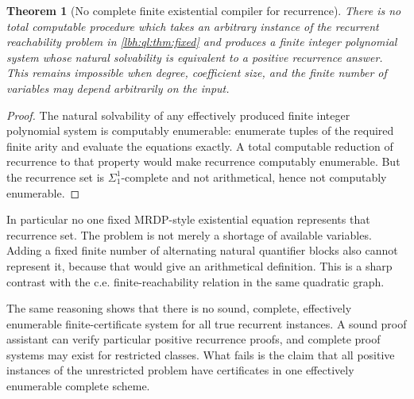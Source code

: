\documentclass[11pt,letterpaper]{article}
\newtheorem{theorem}{Theorem}[section]
\theoremstyle{definition}
\theoremstyle{remark}
\newcommand{\1}{\mathbf 1}
\begin{document}
\begin{theorem}[No complete finite existential compiler for recurrence]
\label{lbh:ql:thm:nofinite}
There is no total computable procedure which takes an arbitrary instance of
the recurrent reachability problem in \cref{lbh:ql:thm:fixed} and produces a finite
integer polynomial system whose natural solvability is equivalent to a
positive recurrence answer. This remains impossible when degree, coefficient
size, and the finite number of variables may depend arbitrarily on the input.
\end{theorem}
\begin{proof}
The natural solvability of any effectively produced finite integer polynomial
system is computably enumerable: enumerate tuples of the required finite
arity and evaluate the equations exactly. A total computable reduction of
recurrence to that property would make recurrence computably enumerable.
But the recurrence set is $\Sigma^1_1$-complete and not arithmetical, hence
not computably enumerable.
\end{proof}
In particular no one fixed MRDP-style existential equation represents that
recurrence set. The problem is not merely a shortage of available variables.
Adding a fixed finite number of alternating natural quantifier blocks also
cannot represent it, because that would give an arithmetical definition.
This is a sharp contrast with the c.e. finite-reachability relation in the
same quadratic graph.

The same reasoning shows that there is no sound, complete, effectively
enumerable finite-certificate system for all true recurrent instances. A
sound proof assistant can verify particular positive recurrence proofs, and
complete proof systems may exist for restricted classes. What fails is the
claim that all positive instances of the unrestricted problem have certificates
in one effectively enumerable complete scheme.
\end{document}
